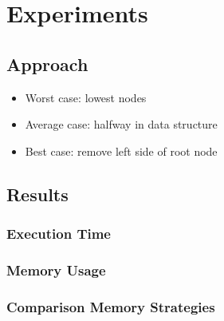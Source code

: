 \chapter{Experiments}

\section{Approach}

\begin{itemize}
  \item Worst case:   lowest nodes
  \item Average case: halfway in data structure
  \item Best case:    remove left side of root node
\end{itemize}

\section{Results}

\subsection{Execution Time}


\subsection{Memory Usage}


\subsection{Comparison Memory Strategies}